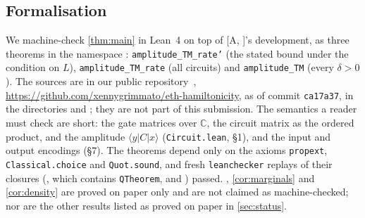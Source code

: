 \documentclass[10pt]{amsart}
\theoremstyle{plain}
\theoremstyle{definition}
\theoremstyle{remark}
\numberwithin{equation}{section}
\newcommand{\amp}[3]{\langle #1|#2|#3\rangle}
\newcommand{\A}[1][]{\textup{[A\if\relax\detokenize{#1}\relax\else, #1\fi]}}
\begin{document}
\subsection{Formalisation}\label{sec:formalisation}
We machine-check \cref{thm:main} in Lean~4 on top of \A's development, as three theorems in the
namespace : \texttt{amplitude\_TM\_rate'} (the stated bound under the
condition on $L$), \texttt{amplitude\_TM\_rate} (all circuits) and \texttt{amplitude\_TM} (every
$\delta>0$). The sources are in our public repository~\cite{TulsyanRepo26},
\url{https://github.com/xennygrimmato/eth-hamiltonicity}, as of commit \texttt{ca17a37}, in the
directories  and ;
they are not part of this submission. The semantics a reader must check are short: the gate matrices
over $\mathbb{C}$, the circuit matrix as the ordered product, and the amplitude $\amp{y}{C}{x}$
(\texttt{Circuit.lean}, \S1), and the input and output encodings (\S7). The theorems depend only on
the axioms \texttt{propext}, \texttt{Classical.choice} and \texttt{Quot.sound}, and fresh
\texttt{leanchecker} replays of their closures (, which contains
\texttt{QTheorem}, and ) passed. ,
\cref{cor:marginals} and \cref{cor:density} are proved on paper only and are not claimed as
machine-checked; nor are the other results listed as proved on paper in \cref{sec:status}.
\end{document}
